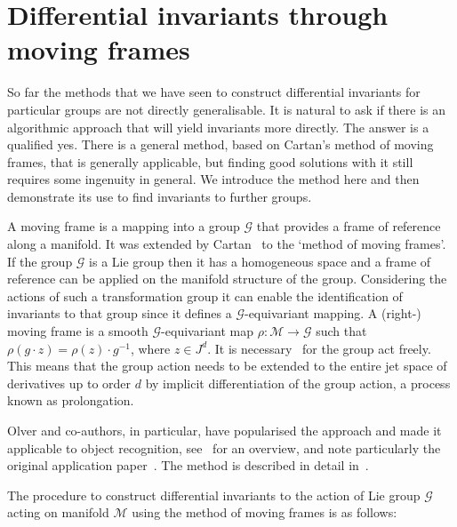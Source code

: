 \documentclass[review,onefignum,onetabnum]{siamonline190516}
\begin{document}
\section{Differential invariants through moving frames}\label{sec:movingframes}

So far the methods that we have seen to construct differential invariants for particular groups are not directly generalisable. It is natural to ask if there is an algorithmic approach that will yield invariants more directly. The answer is a qualified yes. There is a general method, based on Cartan's method of moving frames, that is generally applicable, but finding good solutions with it still requires some ingenuity in general. We introduce the method here and then demonstrate its use to find invariants to further groups.

A moving frame is a mapping into a group $\mathcal{G}$ that provides a frame of reference along a manifold.  It was extended by Cartan~\cite{Cartan35} to the `method of moving frames'. If the group $\mathcal{G}$ is a Lie group then it has a homogeneous space and a frame of reference can be applied on the manifold structure of the group. Considering the actions of such a transformation group it can enable the identification of invariants to that group since it defines a $\mathcal{G}$-equivariant mapping. A (right-) moving frame is a smooth $\mathcal{G}$-equivariant map $\rho : \mathcal{M} \to \mathcal{G}$ such that $\rho (g \cdot z) = \rho(z) \cdot g^{-1}$, where $z \in J^d$. It is necessary~\cite{Olver2013} for the group act freely. This means that the group action needs to be extended to the entire jet space of derivatives up to order $d$ by implicit differentiation of the group action, a process known as prolongation.

Olver and co-authors, in particular, have popularised the approach and made it applicable to object recognition, see~\cite{Olver2005} for an overview, and note particularly the original application paper~\cite{Calabi1998}. The method is described in detail in~\cite{OlverCIT}.

The procedure to construct differential invariants to the action of Lie group $\mathcal{G}$ acting on manifold $\mathcal{M}$ using the method of moving frames is as follows:
\end{document}
